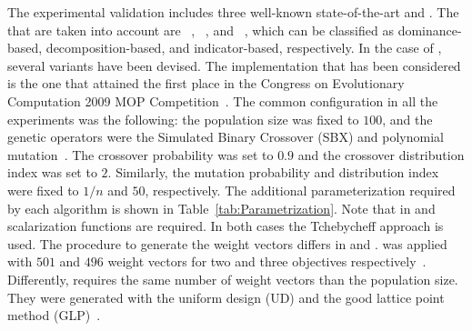 The experimental validation includes three well-known state-of-the-art \MOEAS{} and \VSDMOEA{}.
%
The \MOEAS{} that are taken into account are \NSGAII{}~\cite{Joel:jMetal}, \MOEAD{}~\cite{MOEADCode}, and \RMOEA{}~\cite{R2EMOACode}, 
which can be classified as dominance-based, decomposition-based, and indicator-based, respectively.
%
In the case of \MOEAD{}, several variants have been devised.
%
The \MOEAD{} implementation that has been considered is the one that attained the first place in the Congress on Evolutionary Computation 
2009 MOP Competition~\cite{zhang2009performance}.
%
The common configuration in all the experiments was the following: the population size was fixed to $100$, and the genetic operators were the Simulated Binary Crossover (SBX) and polynomial 
mutation~\cite{Joel:SBX1994, Joel:Mutation}.
%
The crossover probability was set to $0.9$ and the crossover distribution index was set to $2$.
%
Similarly, the mutation probability and distribution index were fixed to $1/n$ and $50$, respectively.
%
The additional parameterization required by each algorithm is shown in Table~\ref{tab:Parametrization}.
%
Note that in \MOEAD{} and \RMOEA{} scalarization functions are required.
%
In both cases the Tchebycheff approach is used.
%
The procedure to generate the weight vectors differs in \MOEAD{} and \RMOEA{}.
%
\RMOEA{} was applied with $501$ and $496$ weight vectors for two and three objectives respectively~\cite{trautmann2013r2}.
%
Differently, \MOEAD{} requires the same number of weight vectors than the population size.
%
They were generated with the uniform design (UD) and the good lattice point method (GLP)~\cite{Joel:MOEAD_Uniform_Design, Joel:Kuhn_Munkres}.


